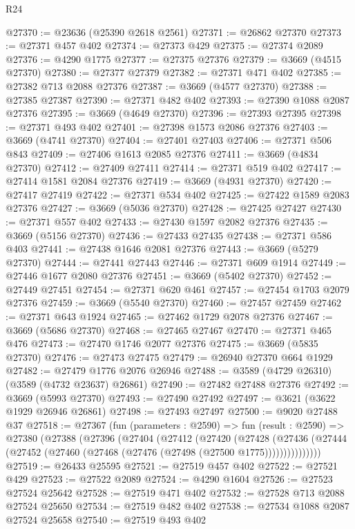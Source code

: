 \begin{lexlean}{R24}
\begin{coremodule}
@27370 := @23636 (@25390 @2618 @2561)
@27371 := @26862 @27370
@27373 := @27371 @457 @402
@27374 := @27373 @429
@27375 := @27374 @2089
@27376 := @4290 @1775
@27377 := @27375 @27376
@27379 := @3669 (@4515 @27370)
@27380 := @27377 @27379
@27382 := @27371 @471 @402
@27385 := @27382 @713 @2088 @27376
@27387 := @3669 (@4577 @27370)
@27388 := @27385 @27387
@27390 := @27371 @482 @402
@27393 := @27390 @1088 @2087 @27376
@27395 := @3669 (@4649 @27370)
@27396 := @27393 @27395
@27398 := @27371 @493 @402
@27401 := @27398 @1573 @2086 @27376
@27403 := @3669 (@4741 @27370)
@27404 := @27401 @27403
@27406 := @27371 @506 @843
@27409 := @27406 @1613 @2085 @27376
@27411 := @3669 (@4834 @27370)
@27412 := @27409 @27411
@27414 := @27371 @519 @402
@27417 := @27414 @1581 @2084 @27376
@27419 := @3669 (@4931 @27370)
@27420 := @27417 @27419
@27422 := @27371 @534 @402
@27425 := @27422 @1589 @2083 @27376
@27427 := @3669 (@5036 @27370)
@27428 := @27425 @27427
@27430 := @27371 @557 @402
@27433 := @27430 @1597 @2082 @27376
@27435 := @3669 (@5156 @27370)
@27436 := @27433 @27435
@27438 := @27371 @586 @403
@27441 := @27438 @1646 @2081 @27376
@27443 := @3669 (@5279 @27370)
@27444 := @27441 @27443
@27446 := @27371 @609 @1914
@27449 := @27446 @1677 @2080 @27376
@27451 := @3669 (@5402 @27370)
@27452 := @27449 @27451
@27454 := @27371 @620 @461
@27457 := @27454 @1703 @2079 @27376
@27459 := @3669 (@5540 @27370)
@27460 := @27457 @27459
@27462 := @27371 @643 @1924
@27465 := @27462 @1729 @2078 @27376
@27467 := @3669 (@5686 @27370)
@27468 := @27465 @27467
@27470 := @27371 @465 @476
@27473 := @27470 @1746 @2077 @27376
@27475 := @3669 (@5835 @27370)
@27476 := @27473 @27475
@27479 := @26940 @27370 @664 @1929
@27482 := @27479 @1776 @2076 @26946
@27488 := @3589 (@4729 @26310) (@3589 (@4732 @23637) @26861)
@27490 := @27482 @27488 @27376
@27492 := @3669 (@5993 @27370)
@27493 := @27490 @27492
@27497 := @3621 (@3622 @1929 @26946 @26861)
@27498 := @27493 @27497
@27500 := @9020 @27488 @37
@27518 := @27367
    (fun (parameters : @2590) =>
    fun (result : @2590) =>
    @27380
      (@27388
        (@27396
          (@27404
            (@27412
              (@27420
                (@27428
                  (@27436
                    (@27444 (@27452 (@27460 (@27468 (@27476 (@27498 (@27500 @1775)))))))))))))))
@27519 := @26433 @25595
@27521 := @27519 @457 @402
@27522 := @27521 @429
@27523 := @27522 @2089
@27524 := @4290 @1604
@27526 := @27523 @27524 @25642
@27528 := @27519 @471 @402
@27532 := @27528 @713 @2088 @27524 @25650
@27534 := @27519 @482 @402
@27538 := @27534 @1088 @2087 @27524 @25658
@27540 := @27519 @493 @402

\end{coremodule}
\end{lexlean}
